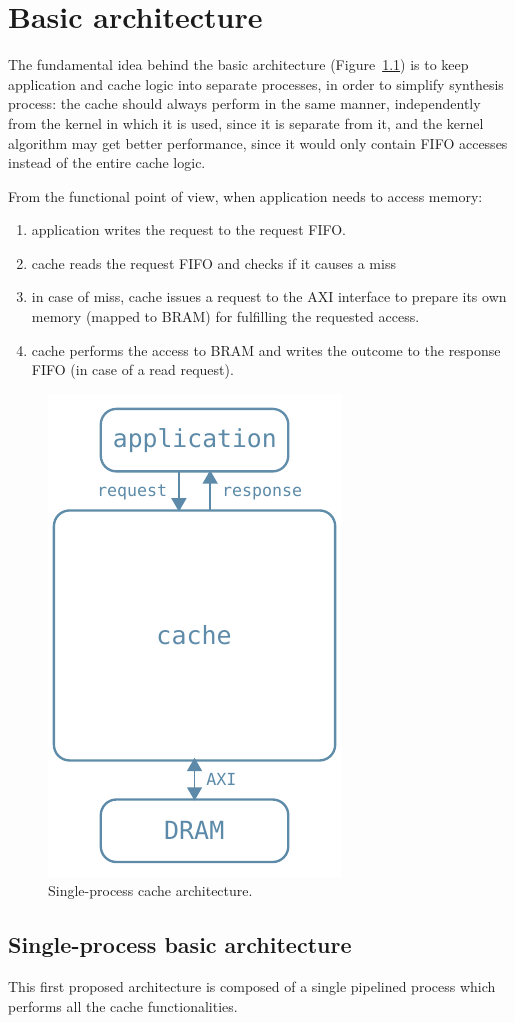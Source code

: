 \documentclass[11pt,a4paper]{memoir}
\begin{document}
\chapter{Basic architecture}
The fundamental idea behind the basic architecture
(Figure~\ref{fig:basic_arch}) is to keep application and cache logic into
separate processes, in order to simplify synthesis process: the cache should
always perform in the same manner, independently from the kernel in which it is
used, since it is separate from it, and the kernel algorithm may get better
performance, since it would only contain FIFO accesses instead of the entire
cache logic.

\bigskip
From the functional point of view, when application needs to access memory:
\begin{enumerate}
	\item application writes the request to the request FIFO.
	\item cache reads the request FIFO and checks if it causes a miss
	\item in case of miss, cache issues a request to the AXI interface to
		prepare its own memory (mapped to BRAM) for fulfilling the
		requested access.
	\item cache performs the access to BRAM and writes the outcome to the
		response FIFO (in case of a read request).
\end{enumerate}

\begin{figure}
	\centering
	\includegraphics[width=.3\textwidth]{basic_arch}
	\caption{Single-process cache architecture.}
	\label{fig:basic_arch}
\end{figure}

\section{Single-process basic architecture}
This first proposed architecture is composed of a single pipelined process
which performs all the cache functionalities.
\end{document}
